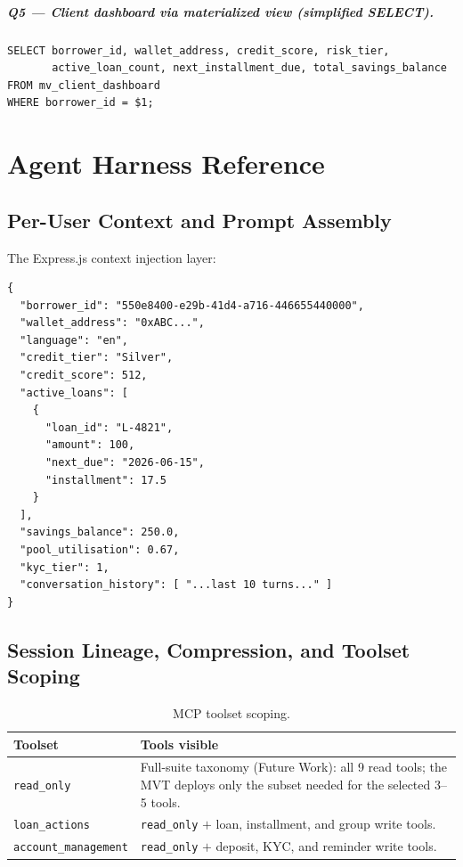 \documentclass[12pt,a4paper]{report}
\newcommand{\tableheadcolor}{\rowcolor{TableHeadBg}}
\begin{document}
\paragraph{Q5 --- Client dashboard via materialized view (simplified SELECT).}
\begin{verbatim}
SELECT borrower_id, wallet_address, credit_score, risk_tier,
       active_loan_count, next_installment_due, total_savings_balance
FROM mv_client_dashboard
WHERE borrower_id = $1;
\end{verbatim}

\chapter{Agent Harness Reference}
\label{app:agent-harness}

\section{Per-User Context and Prompt Assembly}

The Express.js context injection layer:

\begin{verbatim}
{
  "borrower_id": "550e8400-e29b-41d4-a716-446655440000",
  "wallet_address": "0xABC...",
  "language": "en",
  "credit_tier": "Silver",
  "credit_score": 512,
  "active_loans": [
    {
      "loan_id": "L-4821",
      "amount": 100,
      "next_due": "2026-06-15",
      "installment": 17.5
    }
  ],
  "savings_balance": 250.0,
  "pool_utilisation": 0.67,
  "kyc_tier": 1,
  "conversation_history": [ "...last 10 turns..." ]
}
\end{verbatim}

\section{Session Lineage, Compression, and Toolset Scoping}

\begin{table}[H]
\centering
\caption[MCP toolset scoping]{MCP toolset scoping.}
\label{tab:agent-toolsets}
\begin{tabular}{p{3.5cm}p{9cm}}
\toprule
\tableheadcolor
\textbf{Toolset} & \textbf{Tools visible} \\
\midrule
\texttt{read\_only} & Full-suite taxonomy (Future Work): all 9 read tools; the MVT deploys only the subset needed for the selected 3--5 tools. \\
\texttt{loan\_actions} & \texttt{read\_only} $+$ loan, installment, and group write tools. \\
\texttt{account\_management} & \texttt{read\_only} $+$ deposit, KYC, and reminder write tools. \\
\bottomrule
\end{tabular}
\end{table}
\end{document}
